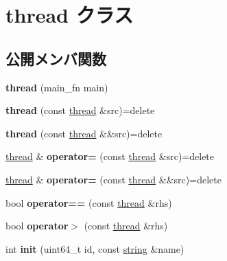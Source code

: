 \hypertarget{classthread}{}\section{thread クラス}
\label{classthread}
\subsection*{公開メンバ関数}
\begin{DoxyCompactItemize}
\item 
\hypertarget{classthread_a1db10940bc1734720d5a562d046b2d41}{}{\bfseries thread} (main\+\_\+fn main)\label{classthread_a1db10940bc1734720d5a562d046b2d41}

\item 
\hypertarget{classthread_a2debe550e8c36b7c7bafde6861527b6a}{}{\bfseries thread} (const \hyperlink{classthread}{thread} \&src)=delete\label{classthread_a2debe550e8c36b7c7bafde6861527b6a}

\item 
\hypertarget{classthread_af2d2b9d1eb276e3d8911694c84cb5f33}{}{\bfseries thread} (const \hyperlink{classthread}{thread} \&\&src)=delete\label{classthread_af2d2b9d1eb276e3d8911694c84cb5f33}

\item 
\hypertarget{classthread_a4d7ef0a71785e85bbed76e1a983e41c0}{}\hyperlink{classthread}{thread} \& {\bfseries operator=} (const \hyperlink{classthread}{thread} \&src)=delete\label{classthread_a4d7ef0a71785e85bbed76e1a983e41c0}

\item 
\hypertarget{classthread_aa248d01f65405fe1f03c1526c54d038f}{}\hyperlink{classthread}{thread} \& {\bfseries operator=} (const \hyperlink{classthread}{thread} \&\&src)=delete\label{classthread_aa248d01f65405fe1f03c1526c54d038f}

\item 
\hypertarget{classthread_accfc6460fe7c41635f41d9ad56554eb5}{}bool {\bfseries operator==} (const \hyperlink{classthread}{thread} \&rhs)\label{classthread_accfc6460fe7c41635f41d9ad56554eb5}

\item 
\hypertarget{classthread_a8ac74ad7dd695e6c9b46a17ade8a4c12}{}bool {\bfseries operator$>$} (const \hyperlink{classthread}{thread} \&rhs)\label{classthread_a8ac74ad7dd695e6c9b46a17ade8a4c12}

\item 
\hypertarget{classthread_a4e75aa7159fa67144629709c31ccf229}{}int {\bfseries init} (uint64\+\_\+t id, const \hyperlink{classstring}{string} \&name)\label{classthread_a4e75aa7159fa67144629709c31ccf229}


\end{DoxyCompactItemize}
